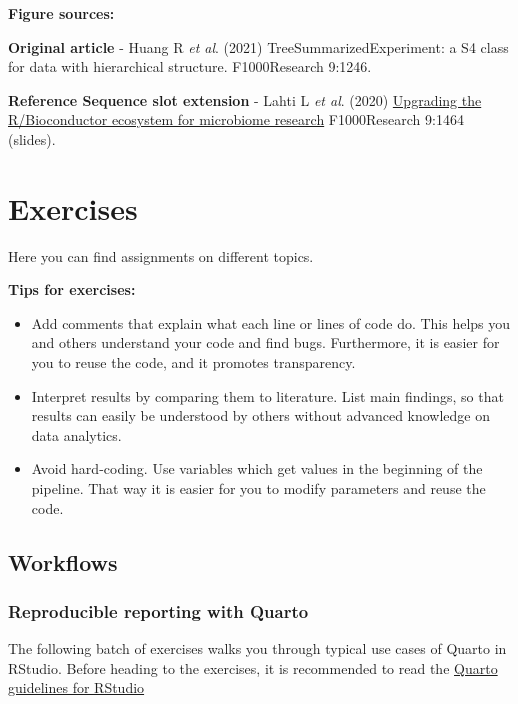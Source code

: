 \documentclass[
]{book}
\providecommand{\tightlist}{%
  \setlength{\itemsep}{0pt}\setlength{\parskip}{0pt}}
\begin{document}
\textbf{Figure sources:}

\textbf{Original article}
- Huang R \emph{et al}. (2021) TreeSummarizedExperiment: a S4 class
for data with hierarchical structure. F1000Research 9:1246. \citep{Huang2021}

\textbf{Reference Sequence slot extension}
- Lahti L \emph{et al}. (2020) \href{https://doi.org/10.7490/\%20f1000research.1118447.1}{Upgrading the R/Bioconductor ecosystem for microbiome
research} F1000Research 9:1464 (slides).

\hypertarget{exercises}{%
\chapter{Exercises}\label{exercises}}

Here you can find assignments on different topics.

\textbf{Tips for exercises:}

\begin{itemize}
\tightlist
\item
  Add comments that explain what each line or lines of code do. This helps you and others understand your code and find bugs. Furthermore, it is easier for you to reuse the code, and it promotes transparency.
\item
  Interpret results by comparing them to literature. List main findings, so that results can easily be understood by others without advanced knowledge on data analytics.
\item
  Avoid hard-coding. Use variables which get values in the beginning of the pipeline. That way it is easier for you to modify parameters and reuse the code.
\end{itemize}

\hypertarget{workflows}{%
\section{Workflows}\label{workflows}}

\hypertarget{reproducible-reporting-with-quarto}{%
\subsection{Reproducible reporting with Quarto}\label{reproducible-reporting-with-quarto}}

The following batch of exercises walks you through typical use cases of Quarto
in RStudio. Before heading to the exercises, it is recommended to read the
\href{https://quarto.org/docs/tools/rstudio.html}{Quarto guidelines for RStudio}
\end{document}
